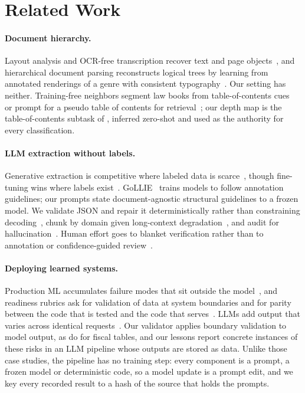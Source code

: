 \documentclass[letterpaper]{article} %
\begin{document}
\section{Related Work}
\label{sec:related}

\paragraph{Document hierarchy.} Layout analysis and OCR-free transcription
recover text and page
objects~\citep{lopez2009grobid,zhong2019publaynet,xu2020layoutlm,huang2022layoutlmv3,kim2022donut,blecher2023nougat},
and hierarchical document parsing reconstructs logical trees by learning from
annotated renderings of a genre with consistent
typography~\citep{rausch2021docparser,ma2023hrdoc,wang2024detect,xing2024dochienet,wang2025unihdsa}.
Our setting has neither. Training-free neighbors segment law books from
table-of-contents cues~\citep{wehnert2025hips} or prompt for a pseudo table of
contents for retrieval~\citep{jeong2025docsray}; our depth map is the
table-of-contents subtask of \citet{wang2024detect}, inferred zero-shot and
used as the authority for every classification.

\paragraph{LLM extraction without labels.} Generative extraction is
competitive where labeled data is
scarce~\citep{agrawal2022large,wadhwa2023revisiting,xu2024large}, though
fine-tuning wins where labels exist~\citep{liu2022fewshot}.
GoLLIE~\citep{sainz2024gollie} trains models to follow annotation guidelines;
our prompts state document-agnostic structural guidelines to a frozen model.
We validate JSON and repair it deterministically rather than constraining
decoding~\citep{willard2023efficient}, chunk by domain given long-context
degradation~\citep{liu2024lost}, and audit for
hallucination~\citep{ji2023survey}. Human effort goes to blanket verification
rather than to annotation or confidence-guided
review~\citep{monarch2021human,settles2009active,li2023coannotating}.

\paragraph{Deploying learned systems.} Production ML accumulates failure modes
that sit outside the model~\citep{sculley2015hidden,paleyes2022challenges},
and readiness rubrics ask for validation of data at system boundaries and for
parity between the code that is tested and the code that
serves~\citep{breck2017mltestscore,breck2019datavalidation}. LLMs add output
that varies across identical requests~\citep{ouyang2023nondeterminism}. Our
validator applies boundary validation to model output, as
\citet{aggarwal2025fiscal} do for fiscal tables, and our lessons report
concrete instances of these risks in an LLM pipeline whose outputs are stored
as data. Unlike those case studies, the pipeline has no training step: every
component is a prompt, a frozen model or deterministic code, so a model update
is a prompt edit, and we key every recorded result to a hash of the source that
holds the prompts.
\end{document}
